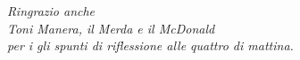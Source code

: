 \begin{fullpaper}
\medskip

\begin{center}
\it Ringrazio anche\\ Toni Manera, il Merda e il McDonald\\ per i gli spunti di riflessione alle quattro di mattina.
\end{center}
\endgroup

\cleardoublepage

\begingroup
{}
\setcounter{tocdepth}{1} %
\tableofcontents
\endgroup

\cleardoublepage

\end{fullpaper}